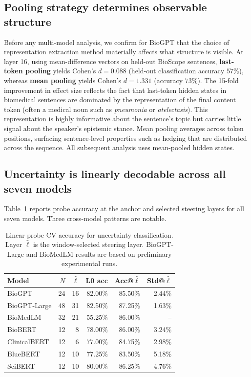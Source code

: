 \documentclass[11pt,a4paper]{article}
\begin{document}
\subsection{Pooling strategy determines observable structure}
\label{sec:pooling}

Before any multi-model analysis, we confirm for BioGPT that the choice
of representation extraction method materially affects what structure is
visible. At layer 16, using mean-difference vectors on held-out BioScope
sentences, \textbf{last-token pooling} yields Cohen's $d = 0.088$
(held-out classification accuracy $57\%$), whereas \textbf{mean pooling}
yields Cohen's $d = 1.331$ (accuracy $73\%$). The 15-fold improvement in
effect size reflects the fact that last-token hidden states in biomedical
sentences are dominated by the representation of the final content token
(often a medical noun such as \emph{pneumonia} or \emph{atelectasis}).
This representation is highly informative about the sentence's topic but
carries little signal about the speaker's epistemic stance. Mean pooling
averages across token positions, surfacing sentence-level properties such
as hedging that are distributed across the sequence. All subsequent
analysis uses mean-pooled hidden states.

\subsection{Uncertainty is linearly decodable across all seven models}
\label{sec:probing}

Table~\ref{tab:probe_all} reports probe accuracy at the anchor and
selected steering layers for all seven models. Three cross-model patterns
are notable.

\begin{table}[ht]
\centering
\caption{Linear probe CV accuracy for uncertainty classification. Layer
  $\hat{\ell}$ is the window-selected steering layer. BioGPT-Large and
  BioMedLM results are based on preliminary experimental runs.}
\label{tab:probe_all}
\begin{tabular}{lrrrrr}
\toprule
\textbf{Model} & $N$ & $\hat{\ell}$ & \textbf{L0 acc} &
  \textbf{Acc@}$\hat{\ell}$ & \textbf{Std@}$\hat{\ell}$ \\
\midrule
BioGPT          & 24 & 16 & 82.00\% & 85.50\% & 2.44\% \\
BioGPT-Large    & 48 & 31 & 82.50\% & 87.25\% & 1.63\% \\
BioMedLM        & 32 & 21 & 55.25\% & 86.00\% & --     \\
\midrule
BioBERT         & 12 &  8 & 78.00\% & 86.00\% & 3.24\% \\
ClinicalBERT    & 12 &  6 & 77.00\% & 84.75\% & 2.98\% \\
BlueBERT        & 12 & 10 & 77.25\% & 83.50\% & 5.18\% \\
SciBERT         & 12 & 10 & 80.00\% & 86.25\% & 4.76\% \\
\bottomrule
\end{tabular}
\end{table}
\end{document}
